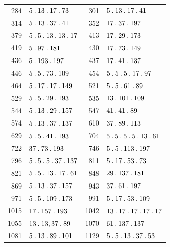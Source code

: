 \begin{longtable}{@{}r|l@{\qquad}r|l@{}}
284 & $5\mathbin{.} 13\mathbin{.} 17\mathbin{.} 73$ & 301 & $5\mathbin{.} 13\mathbin{.} 17\mathbin{.} 41$\\
314 & $5\mathbin{.} 13\mathbin{.} 37\mathbin{.} 41$ & 352 & $17\mathbin{.} 37\mathbin{.} 197$\\
379 & $5\mathbin{.} 5\mathbin{.} 13\mathbin{.} 13\mathbin{.} 17$ & 413 & $17\mathbin{.} 29\mathbin{.} 173$\\
419 & $5\mathbin{.} 97\mathbin{.} 181$ & 430 & $17\mathbin{.} 73\mathbin{.} 149$\\
436 & $5\mathbin{.} 193\mathbin{.} 197$ & 437 & $17\mathbin{.} 41\mathbin{.} 137$\\
446 & $5\mathbin{.} 5\mathbin{.} 73\mathbin{.} 109$ & 454 & $5\mathbin{.} 5\mathbin{.} 5\mathbin{.} 17\mathbin{.} 97$\\
464 & $5\mathbin{.} 17\mathbin{.} 17\mathbin{.} 149$ & 521 & $5\mathbin{.} 5\mathbin{.} 61\mathbin{.} 89$\\
529 & $5\mathbin{.} 5\mathbin{.} 29\mathbin{.} 193$ & 535 & $13\mathbin{.} 101\mathbin{.} 109$\\
544 & $5\mathbin{.} 13\mathbin{.} 29\mathbin{.} 157$ & 547 & $41\mathbin{.} 41\mathbin{.} 89$\\
574 & $5\mathbin{.} 13\mathbin{.} 37\mathbin{.} 137$ & 610 & $37\mathbin{.} 89\mathbin{.} 113$\\
629 & $5\mathbin{.} 5\mathbin{.} 41\mathbin{.} 193$ & 704 & $5\mathbin{.} 5\mathbin{.} 5\mathbin{.} 5\mathbin{.} 13\mathbin{.} 61$\\
722 & $37\mathbin{.} 73\mathbin{.} 193$ & 746 & $5\mathbin{.} 5\mathbin{.} 113\mathbin{.} 197$\\
796 & $5\mathbin{.} 5\mathbin{.} 5\mathbin{.} 37\mathbin{.} 137$ & 811 & $5\mathbin{.} 17\mathbin{.} 53\mathbin{.} 73$\\
821 & $5\mathbin{.} 5\mathbin{.} 13\mathbin{.} 17\mathbin{.} 61$ & 848 & $29\mathbin{.} 137\mathbin{.} 181$\\
869 & $5\mathbin{.} 13\mathbin{.} 37\mathbin{.} 157$ & 943 & $37\mathbin{.} 61\mathbin{.} 197$\\
971 & $5\mathbin{.} 5\mathbin{.} 109\mathbin{.} 173$ & 991 & $5\mathbin{.} 17\mathbin{.} 53\mathbin{.} 109$\\
1015 & $17\mathbin{.} 157\mathbin{.} 193$ & 1042 & $13\mathbin{.} 17\mathbin{.} 17\mathbin{.} 17\mathbin{.} 17$\\
1055 & $13\mathbin{.} 13,37\mathbin{.} 89$ & 1070 & $61\mathbin{.} 137\mathbin{.} 137$\\
1081 & $5\mathbin{.} 13\mathbin{.} 89\mathbin{.} 101$ & 1129 & $5\mathbin{.} 5\mathbin{.} 13\mathbin{.} 37\mathbin{.} 53$\\
\end{longtable}\endgroup
